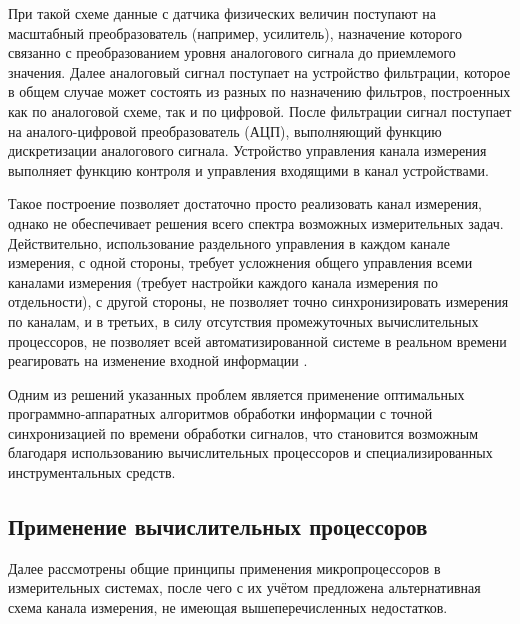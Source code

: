 \documentclass[a4paper, 14pt, titlepage]{extarticle}
\begin{document}
  При такой схеме данные с датчика физических величин поступают на масштабный преобразователь (например, усилитель),
  назначение которого связанно с преобразованием уровня аналогового сигнала до приемлемого значения.
  Далее аналоговый сигнал поступает на устройство фильтрации, которое в общем случае может состоять
  из разных по назначению фильтров, построенных как по аналоговой схеме, так и по цифровой. После
  фильтрации сигнал поступает на аналого-цифровой преобразователь (АЦП), выполняющий
  функцию дискретизации аналогового сигнала. Устройство управления канала измерения
  выполняет функцию контроля и управления входящими в канал устройствами.

  Такое построение позволяет
  достаточно просто реализовать канал измерения, однако не обеспечивает решения всего спектра
  возможных измерительных задач. Действительно, использование раздельного управления в каждом канале
  измерения, с одной стороны, требует усложнения общего управления всеми каналами измерения (требует
  настройки каждого канала измерения по отдельности), с другой стороны, не позволяет точно
  синхронизировать измерения по каналам, и в третьих, в силу отсутствия промежуточных вычислительных
  процессоров, не позволяет всей автоматизированной системе в реальном времени реагировать на
  изменение входной информации \cite{stupin-methods}.

  Одним из решений указанных проблем является применение оптимальных программно-аппаратных
  алгоритмов обработки информации с точной синхронизацией по времени  обработки сигналов,
  что становится возможным благодаря использованию вычислительных процессоров и специализированных инструментальных средств.

  \subsection{Применение вычислительных процессоров}

  Далее рассмотрены общие принципы применения микропроцессоров в измерительных системах, после чего
  с их учётом предложена альтернативная схема канала измерения, не имеющая вышеперечисленных недостатков.
\end{document}
